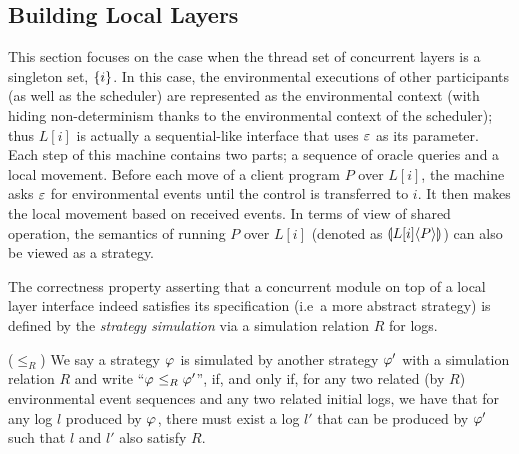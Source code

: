 \subsection{Building Local Layers}

This section focuses on the case when the thread set of concurrent layers is a singleton set, $\set{i}$.
In this case, 
the environmental executions of other participants (as well as the scheduler) are
represented as  the environmental context (with hiding non-determinism thanks to the environmental context of the scheduler);
thus $L[i]$ is actually a sequential-like interface that uses $\oracle$ as its parameter. 
Each step of  this machine contains two parts; a sequence of oracle queries and a local movement.
Before each move of a client program $P$ over $L[i]$,
the  machine  asks $\oracle$ for environmental events until the control is transferred to $i$. 
It then makes the local movement based on
received events.
In terms of view of shared operation, the semantics of running $P$ over $L[i]$ (denoted as $\ssem{P}{L[i]}$) can also be viewed
as a strategy.


The correctness property asserting that a concurrent module on top of a local layer interface indeed
satisfies its specification (i.e\, a more abstract strategy) is defined
by the \emph{strategy simulation} via a simulation relation $R$ for logs.




\begin{definition}($\le_R$) We say a strategy $\strat{}$ is simulated by
another strategy $\strat{}'$ with a simulation relation $R$ and write ``$\strat{} \le_R \strat{}'$'', if, and only if, for any two related (by $R$) environmental event sequences and any two related initial logs, we have that
for any log $l$ produced by $\strat{}$, there must exist a log $l'$ that can be produced by $\strat{}'$ such that $l$ and $l'$ also satisfy $R$.
\end{definition}

